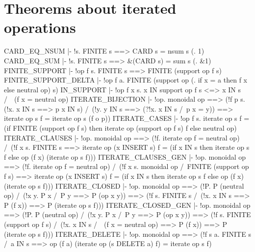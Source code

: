 \section{Theorems about iterated operations}
\THEOREM CARD\_EQ\_NSUM
  |- !s. FINITE s ==> CARD s = nsum s (\x. 1)
\ENDTHEOREM
\THEOREM CARD\_EQ\_SUM
  |- !s. FINITE s ==> &(CARD s) = sum s (\x. &1)
\ENDTHEOREM
\THEOREM FINITE\_SUPPORT
  |- !op f s. FINITE s ==> FINITE (support op f s)
\ENDTHEOREM
\THEOREM FINITE\_SUPPORT\_DELTA
  |- !op f a. FINITE (support op (\x. if x = a then f x else neutral op) s)
\ENDTHEOREM
\THEOREM IN\_SUPPORT
  |- !op f x s. x IN support op f s <=> x IN s /\ ~(f x = neutral op)
\ENDTHEOREM
\THEOREM ITERATE\_BIJECTION
  |- !op. monoidal op
          ==> (!f p s.
                   (!x. x IN s ==> p x IN s) /\
                   (!y. y IN s ==> (?!x. x IN s /\ p x = y))
                   ==> iterate op s f = iterate op s (f o p))
\ENDTHEOREM
\THEOREM ITERATE\_CASES
  |- !op f s.
         iterate op s f =
         (if FINITE (support op f s)
          then iterate op (support op f s) f
          else neutral op)
\ENDTHEOREM
\THEOREM ITERATE\_CLAUSES
  |- !op. monoidal op
          ==> (!f. iterate op {} f = neutral op) /\
              (!f x s.
                   FINITE s
                   ==> iterate op (x INSERT s) f =
                       (if x IN s
                        then iterate op s f
                        else op (f x) (iterate op s f)))
\ENDTHEOREM
\THEOREM ITERATE\_CLAUSES\_GEN
  |- !op. monoidal op
          ==> (!f. iterate op {} f = neutral op) /\
              (!f x s.
                   monoidal op /\ FINITE (support op f s)
                   ==> iterate op (x INSERT s) f =
                       (if x IN s
                        then iterate op s f
                        else op (f x) (iterate op s f)))
\ENDTHEOREM
\THEOREM ITERATE\_CLOSED
  |- !op. monoidal op
          ==> (!P. P (neutral op) /\ (!x y. P x /\ P y ==> P (op x y))
                   ==> (!f s.
                            FINITE s /\ (!x. x IN s ==> P (f x))
                            ==> P (iterate op s f)))
\ENDTHEOREM
\THEOREM ITERATE\_CLOSED\_GEN
  |- !op. monoidal op
          ==> (!P. P (neutral op) /\ (!x y. P x /\ P y ==> P (op x y))
                   ==> (!f s.
                            FINITE (support op f s) /\
                            (!x. x IN s /\ ~(f x = neutral op) ==> P (f x))
                            ==> P (iterate op s f)))
\ENDTHEOREM
\THEOREM ITERATE\_DELETE
  |- !op. monoidal op
          ==> (!f s a.
                   FINITE s /\ a IN s
                   ==> op (f a) (iterate op (s DELETE a) f) = iterate op s f)
